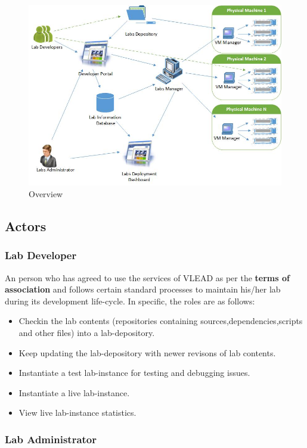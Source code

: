 \documentclass[11pt]{article}
\begin{document}
   \begin{figure}[H]
\centering
\includegraphics[width=16cm]{overview.jpg}
\caption{Overview}
\end{figure}
\subsection{Actors}
\label{sec-3.1}

\subsubsection{Lab Developer}
\label{sec-3.1.1}

   An person who has agreed to use the services of VLEAD as per the
   \textbf{terms of association} and follows certain standard processes to
   maintain his/her lab during its development life-cycle. In
   specific, the roles are as follows:
\begin{itemize}
\item Checkin the lab contents (repositories containing
       sources,dependencies,scripts and other files) into a
       lab-depository.
\item Keep updating the lab-depository with newer revisons of lab contents.
\item Instantiate a test lab-instance for testing and debugging issues.
\item Instantiate a live lab-instance.
\item View live lab-instance statistics.
\end{itemize}
\subsubsection{Lab Administrator}
\label{sec-3.1.2}
\end{document}
